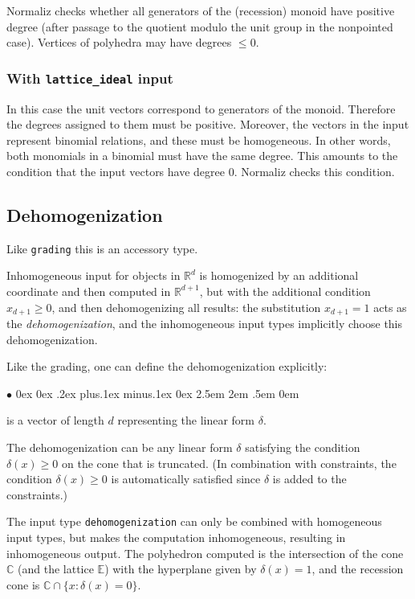 \documentclass[12pt,a4paper]{scrartcl}
\newcommand{\stdli}{ \topsep0ex \partopsep0ex %
\parsep.2ex plus.1ex minus.1ex \itemsep0ex%
\leftmargin2.5em \labelwidth2em \labelsep.5em \rightmargin0em}%
\renewenvironment{itemize}{\begin{list}{{$\bullet$}}{\stdli}}{\end{list}}
\theoremstyle{definition}
\def\CC{{\mathbb C}}
\def\RR{{\mathbb R}}
\def\EE{{\mathbb E}}
\def\itemtt[#1]{\item[\textbf{\ttt{#1}}]}
\def\ttt{\texttt}
\begin{document}
Normaliz checks whether all generators of the (recession) monoid have
positive degree (after passage to the quotient modulo the unit group in the nonpointed case).
Vertices of polyhedra may have degrees $\le 0$.

\subsubsection{With \ttt{lattice\_ideal} input} \label{grad_lattid}

In this case the unit vectors correspond to generators of the
monoid. Therefore the degrees assigned to them must be
positive. Moreover, the vectors in the input represent binomial
relations, and these must be homogeneous. In other words, both
monomials in a binomial must have the same degree. This amounts
to the condition that the input vectors have degree $0$.
Normaliz checks this condition.

\subsection{Dehomogenization}

Like \verb|grading| this is an accessory type.

Inhomogeneous input for objects in $\RR^d$ is homogenized by an additional coordinate and then computed in $\RR^{d+1}$, but with the additional condition $x_{d+1}\ge 0$, and then dehomogenizing all results: the substitution $x_{d+1}=1$ acts as the \emph{dehomogenization}, and the inhomogeneous input types implicitly choose this dehomogenization.

Like the grading, one can define the dehomogenization explicitly:
\begin{itemize}
	\itemtt[dehomogenization] is a vector of length $d$ representing the linear form $\delta$.
\end{itemize}

The dehomogenization can be any linear form $\delta$  satisfying the condition $\delta(x)\ge 0$ on the cone that is truncated. (In combination with constraints, the condition $\delta(x)\ge 0$ is automatically satisfied since $\delta$ is added to the constraints.)

The input type \verb|dehomogenization| can only be combined with homogeneous input types, but makes the computation inhomogeneous, resulting in inhomogeneous output. The polyhedron computed is the intersection of the cone $\CC$ (and the lattice $\EE$) with the hyperplane given by $\delta(x)=1$, and the recession cone is $\CC\cap\{x:\delta(x)=0\}$.
\end{document}
